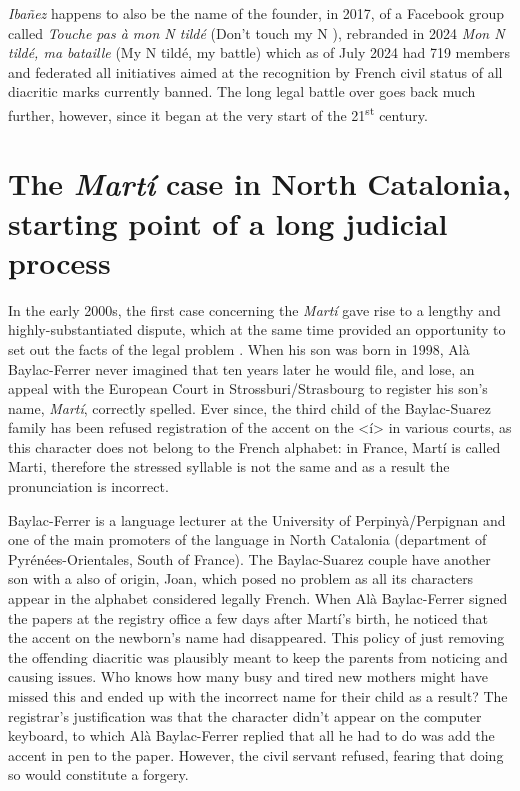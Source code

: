 \documentclass[output=paper,colorlinks,citecolor=brown]{langscibook}
\begin{document}
\textit{Ibañez} happens to also be the name of the founder, in 2017, of a Facebook group called \textit{Touche pas à mon N tildé} (Don't touch my N ), rebranded in 2024 \textit{Mon N tildé, ma bataille} (My N tildé, my battle) which as of July 2024 had 719 members and federated all initiatives aimed at the recognition by French civil status of all diacritic marks currently banned. The long legal battle over  goes back much further, however, since it began at the very start of the 21\textsuperscript{st} century.

\section{The \textit{Martí} case in North Catalonia, starting point of a long judicial process}

In the early 2000s, the first case concerning the   \textit{Martí} gave rise to a lengthy and highly-substantiated dispute, which at the same time provided an opportunity to set out the facts of the legal problem \citep{sm:Esteban2016}. When his son was born in 1998, Alà Baylac-Ferrer never imagined that ten years later he would file, and lose, an appeal with the European Court in Strossburi/Strasbourg to register his son’s name, \textit{Martí}, correctly spelled. Ever since, the third child of the Baylac-Suarez family has been refused registration of the accent on the <í> in various courts, as this character does not belong to the French alphabet: in France, Martí is called Marti, therefore the stressed syllable is not the same and as a result the pronunciation is incorrect.

Baylac-Ferrer is a  language lecturer at the University of Perpinyà/Per\-pignan and one of the main promoters of the language in North Catalonia (department of Pyrénées-Orientales, South of France). The Baylac-Suarez couple have another son with a  also of  origin, Joan, which posed no problem as all its characters appear in the alphabet considered legally French. When Alà Baylac-Ferrer signed the papers at the registry office a few days after Martí's birth, he noticed that the accent on the newborn's name had disappeared. This policy of just removing the offending diacritic was plausibly meant to keep the parents from noticing and causing issues. Who knows how many busy and tired new mothers might have missed this and ended up with the incorrect name for their child as a result? The registrar's justification was that the character didn't appear on the computer keyboard, to which Alà Baylac-Ferrer replied that all he had to do was add the accent in pen to the paper. However, the civil servant refused, fearing that doing so would constitute a forgery.
\end{document}
